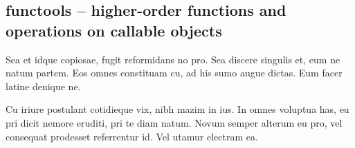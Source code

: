 \subsection{functools -- higher-order functions and operations on callable objects}
Sea et idque copiosae, fugit reformidans no pro. Sea discere singulis et, eum ne natum partem. Eos omnes constituam cu, ad his sumo augue dictas. Eum facer latine denique ne.

Cu iriure postulant cotidieque vix, nibh mazim in ius. In omnes voluptua has, eu pri dicit nemore eruditi, pri te diam natum. Novum semper alterum eu pro, vel consequat prodesset referrentur id. Vel utamur electram ea.

